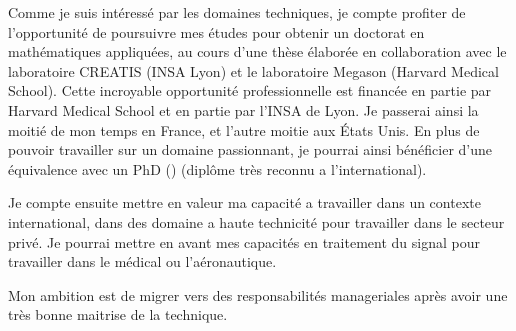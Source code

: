 Comme je suis intéressé par les domaines techniques, je compte profiter de l'opportunité de poursuivre mes études pour obtenir un doctorat en mathématiques appliquées, au cours d'une thèse élaborée en collaboration avec le laboratoire CREATIS (INSA Lyon) et le laboratoire Megason (Harvard Medical School). Cette incroyable opportunité professionnelle est financée en partie par Harvard Medical School et en partie par l'INSA de Lyon. Je passerai ainsi la moitié de mon temps en France, et l'autre moitie aux États Unis.
En plus de pouvoir travailler sur un domaine passionnant, je pourrai ainsi bénéficier d'une équivalence avec un PhD () (diplôme très reconnu a l'international). 

Je compte ensuite mettre en valeur ma capacité a travailler dans un contexte international, dans des domaine a haute technicité pour travailler dans le secteur privé. Je pourrai mettre en avant mes capacités en traitement du signal pour travailler dans le médical ou l'aéronautique.

Mon ambition est de migrer vers des responsabilités manageriales après avoir une très bonne maitrise de la technique.


